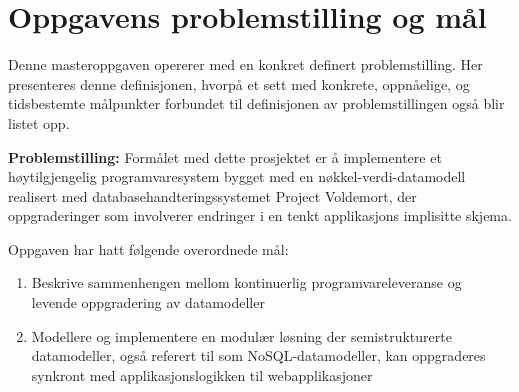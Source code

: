 \section{Oppgavens problemstilling og mål} \label{goals}

Denne masteroppgaven opererer med en konkret definert problemstilling. Her presenteres denne definisjonen, hvorpå et sett med konkrete, oppnåelige, og tidsbestemte målpunkter forbundet til definisjonen av problemstillingen også blir listet opp.

\textbf{Problemstilling:} Formålet med dette prosjektet er å implementere et høytilgjengelig programvaresystem bygget med en nøkkel-verdi-datamodell realisert med databasehandteringssystemet Project Voldemort, der oppgraderinger som involverer endringer i en tenkt applikasjons implisitte skjema.

Oppgaven har hatt følgende overordnede mål:

\begin{enumerate}
  \item Beskrive sammenhengen mellom kontinuerlig programvareleveranse og \\ levende oppgradering av datamodeller %
  \item Modellere og implementere en modulær løsning der semistrukturerte datamodeller, også referert til som NoSQL-datamodeller, kan oppgraderes synkront med applikasjonslogikken til webapplikasjoner %
\end{enumerate}




